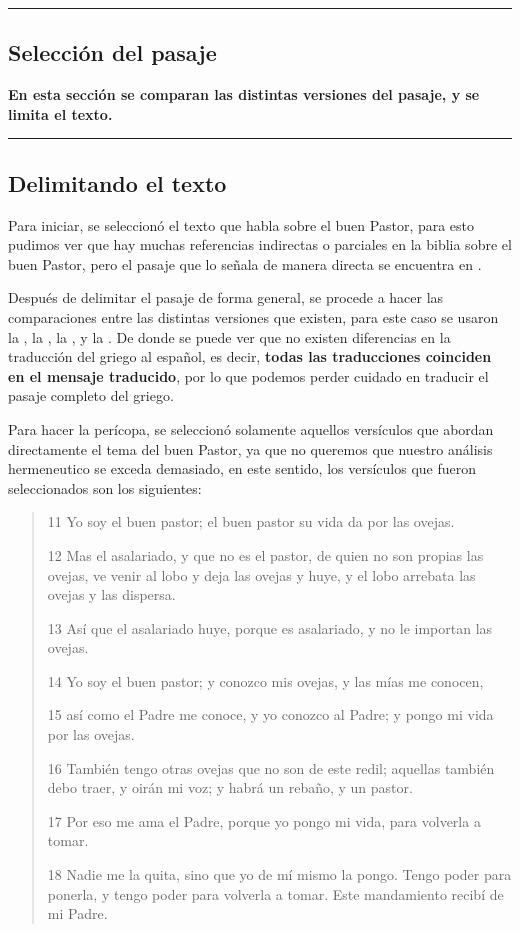 {\color{gray}\hrule}
\begin{center}
\section{Selección del pasaje}
\textbf{En esta sección se comparan las distintas versiones del pasaje, y se limita el texto.}
\end{center}
{\color{gray}\hrule}

\begin{multicols}{2}

\subsection{Delimitando el texto}

  Para iniciar, se seleccionó el texto que habla sobre el buen Pastor,
  para esto pudimos ver que hay muchas referencias indirectas o parciales en la biblia sobre
  el buen Pastor, pero el pasaje que lo señala de manera directa se encuentra en \cite[Juan 10:11-18]{BibliaNVI}.

  Después de delimitar el pasaje de forma general, se procede a hacer las comparaciones entre las distintas versiones
  que existen, para este caso se usaron la \cite[Biblia NVI]{BibliaNVI}, la \cite[Biblia RV]{BibliaRV}, la \cite[Biblia RVC]{BibliaRVC}, y la \cite[Biblia TLA]{BibliaTLA}.
  De donde se puede ver que no existen diferencias en la traducción del griego al español, es decir, \textbf{todas las traducciones coinciden en el mensaje traducido},
  por lo que podemos perder cuidado en traducir el pasaje completo del griego.

  Para hacer la perícopa, se seleccionó solamente aquellos versículos que abordan directamente el tema del buen Pastor, ya que no queremos
  que nuestro análisis hermeneutico se exceda demasiado, en este sentido, los versículos que fueron seleccionados son los siguientes: 
  \begin{quotation}
    11 Yo soy el buen pastor; el buen pastor su vida da por las ovejas. 

    12 Mas el asalariado, y que no es el pastor, de quien no son propias las ovejas, ve venir al lobo y deja las ovejas y huye, y el lobo arrebata las ovejas y las dispersa. 

    13 Así que el asalariado huye, porque es asalariado, y no le importan las ovejas. 

    14 Yo soy el buen pastor; y conozco mis ovejas, y las mías me conocen, 

    15 así como el Padre me conoce, y yo conozco al Padre; y pongo mi vida por las ovejas. 

    16 También tengo otras ovejas que no son de este redil; aquellas también debo traer, y oirán mi voz; y habrá un rebaño, y un pastor. 

    17 Por eso me ama el Padre, porque yo pongo mi vida, para volverla a tomar. 

    18 Nadie me la quita, sino que yo de mí mismo la pongo. Tengo poder para ponerla, y tengo poder para volverla a tomar. Este mandamiento recibí de mi Padre.
  \end{quotation}

\end{multicols}
